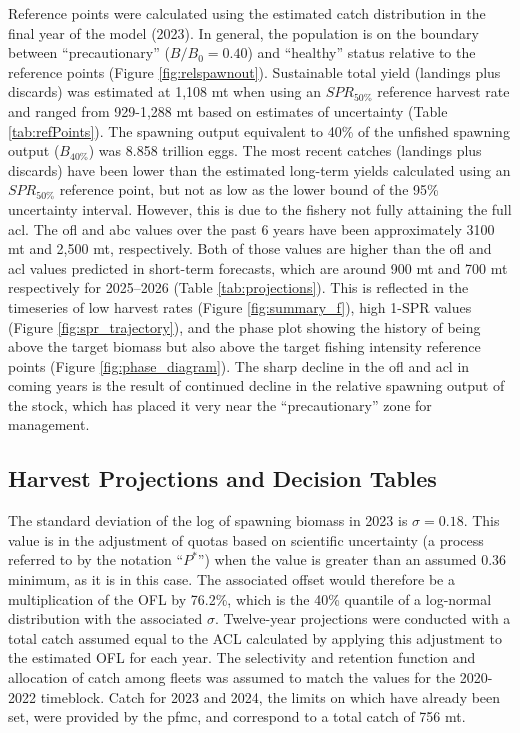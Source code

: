 \documentclass[11pt,
  letterpaper,
]{article}
\begin{document}
Reference points were calculated using the estimated catch distribution in the final year of the model (2023). In general, the population is on the boundary between ``precautionary'' (\(B/B_0 = 0.40\)) and ``healthy'' status relative to the reference points (Figure \ref{fig:relspawnout}). Sustainable total yield (landings plus discards) was estimated at 1,108 mt when using an \(SPR_{50\%}\) reference harvest rate and ranged from 929-1,288 mt based on estimates of uncertainty (Table \ref{tab:refPoints}). The spawning output equivalent to 40\% of the unfished spawning output (\(B_{40\%}\)) was 8.858 trillion eggs. The most recent catches (landings plus discards) have been lower than the estimated long-term yields calculated using an \(SPR_{50\%}\) reference point, but not as low as the lower bound of the 95\% uncertainty interval. However, this is due to the fishery not fully attaining the full \gls{acl}. The \gls{ofl} and \gls{abc} values over the past 6 years have been approximately 3100 mt and 2,500 mt, respectively. Both of those values are higher than the \gls{ofl} and \gls{acl} values predicted in short-term forecasts, which are around 900 mt and 700 mt respectively for 2025--2026 (Table \ref{tab:projections}). This is reflected in the timeseries of low harvest rates (Figure \ref{fig:summary_f}), high 1-SPR values (Figure \ref{fig:spr_trajectory}), and the phase plot showing the history of being above the target biomass but also above the target fishing intensity reference points (Figure \ref{fig:phase_diagram}). The sharp decline in the \gls{ofl} and \gls{acl} in coming years is the result of continued decline in the relative spawning output of the stock, which has placed it very near the ``precautionary'' zone for management.

\hypertarget{harvest-projections-and-decision-tables}{%
\subsection{Harvest Projections and Decision Tables}\label{harvest-projections-and-decision-tables}}

The standard deviation of the log of spawning biomass in 2023 is \(\sigma = 0.18\). This value is in the adjustment of quotas based on scientific uncertainty (a process referred to by the notation ``\(P^*\)'') when the value is greater than an assumed 0.36 minimum, as it is in this case. The associated offset would therefore be a multiplication of the OFL by 76.2\%, which is the 40\% quantile of a log-normal distribution with the associated \(\sigma\). Twelve-year projections were conducted with a total catch assumed equal to the ACL calculated by applying this adjustment to the estimated OFL for each year. The selectivity and retention function and allocation of catch among fleets was assumed to match the values for the 2020-2022 timeblock. Catch for 2023 and 2024, the limits on which have already been set, were provided by the \gls{pfmc}, and correspond to a total catch of 756 mt.
\end{document}
